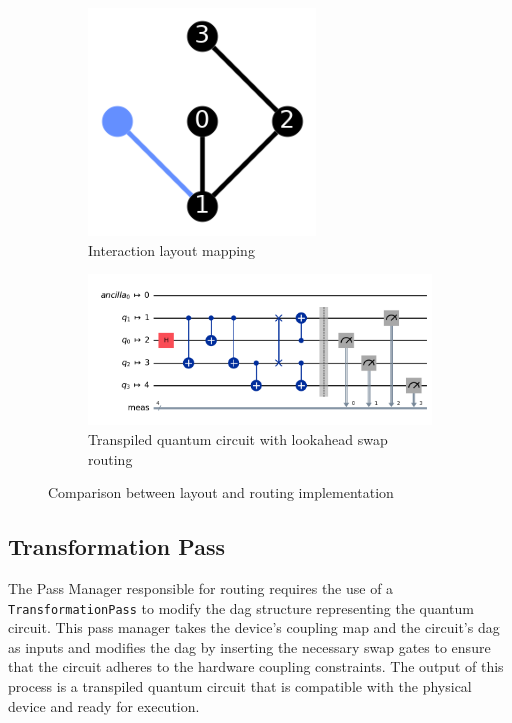 \begin{figure}[htb]
\begin{subfigure}{0.25\linewidth}
        \includegraphics[width=\linewidth]{image/coupling_map_lookahead.png}
        \caption{Interaction layout mapping}
        \label{fig:interaction-mapping}
    \end{subfigure}
    \hfill
    \begin{subfigure}{0.7\linewidth}
        \includegraphics[width=\linewidth]{image/swap_lookahead.png}
        \caption{Transpiled quantum circuit with lookahead swap routing}
        \label{fig:swap-lookahead}
    \end{subfigure}
    \caption{Comparison between layout and routing implementation}
\end{figure}

\subsection{Transformation Pass} %
The Pass Manager responsible for routing requires the use of a \lstinline{TransformationPass} \cite{ibmquantum_transformationpass} to modify the \acrshort{dag} structure representing the quantum circuit. This pass manager takes the device's coupling map and the circuit's \acrshort{dag} as inputs and modifies the \acrshort{dag} by inserting the necessary swap gates to ensure that the circuit adheres to the hardware coupling constraints. The output of this process is a transpiled quantum circuit that is compatible with the physical device and ready for execution.

